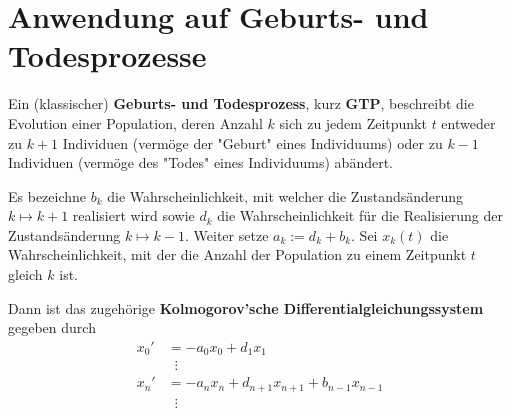 


\chapter{Anwendung auf Geburts- und Todesprozesse}

\begin{konstr} Ein (klassischer) \textbf{Geburts- und Todesprozess}, kurz \textbf{GTP}, beschreibt die Evolution einer Population, deren Anzahl $k$ sich zu jedem Zeitpunkt $t$ entweder zu $k+1$ Individuen (vermöge der "Geburt"\; eines Individuums) oder zu $k-1$ Individuen (vermöge des "Todes"\; eines Individuums) abändert. 
\par
Es bezeichne $b_k$ die Wahrscheinlichkeit, mit welcher die Zustandsänderung $k\mapsto k+1$ realisiert wird  sowie $d_k$  die Wahrscheinlichkeit für die Realisierung der Zustandsänderung $k\mapsto k-1$. Weiter setze $a_k:=d_k+b_k$. Sei $x_k(t)$ die Wahrscheinlichkeit, mit der die Anzahl der Population zu einem Zeitpunkt $t$ gleich $k$ ist. \par
Dann ist das zugehörige  \textbf{Kolmogorov'sche Differentialgleichungssystem} gegeben durch
\begin{align*}
x_0' &= -a_0x_0 + d_1 x_1\\
&\;\;\vdots\\
x_n' &= -a_nx_n + d_{n+1}x_{n+1} + b_{n-1}x_{n-1}  \\
&\;\;\vdots
\end{align*}

\end{konstr}

